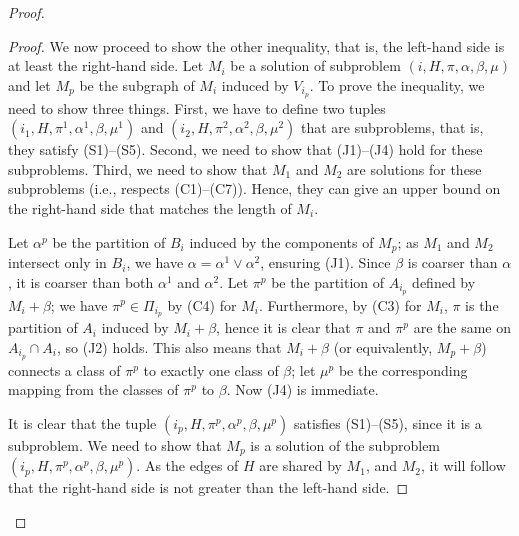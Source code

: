 \begin{proof}
\begin{proof}

We now proceed to show the other inequality, that is, the left-hand side is at least the right-hand side.
Let \(M_i\) be a solution of subproblem \((i, H, \pi, \alpha, \beta, \mu)\) and let \(M_p\) be the subgraph of \(M_i\) induced by \(V_{i_p}\). To prove the inequality, we need to show three things. First, we have to define two tuples \((i_1, H, \pi^1, \alpha^1,\beta,\mu^1)\) and \((i_2, H, \pi^2, \alpha^2,\beta,\mu^2)\) that are subproblems, that is, they satisfy (S1)–(S5). Second, we need to show that (J1)–(J4) hold for these subproblems. Third, we need to show that \(M_1\) and \(M_2\) are solutions for these subproblems (i.e., respects (C1)–(C7)). Hence, they can give an upper bound on the right-hand side that matches the length of \(M_i\).

Let \(\alpha^p\) be the partition of \(B_i\) induced by the components of \(M_p\); as \(M_1\) and \(M_2\) intersect only in \(B_i\), we have \(\alpha = \alpha^1 \vee \alpha^2\), ensuring (J1). Since \(\beta\) is coarser than \(\alpha\), it is coarser than both \(\alpha^1\) and \(\alpha^2\). Let \(\pi^p\) be the partition of \(A_{i_p}\) defined by \(M_i + \beta\); we have \(\pi^p \in \Pi_{i_p}\) by (C4) for \(M_i\). Furthermore, by (C3) for \(M_i\), \(\pi\) is the partition of \(A_i\) induced by \(M_i + \beta\), hence it is clear that \(\pi\) and \(\pi^p\) are the same on \(A_{i_p} \cap A_i\), so (J2) holds. This also means that \(M_i + \beta\) (or equivalently, \(M_p + \beta\)) connects a class of \(\pi^p\) to exactly one class of \(\beta\); let \(\mu^p\) be the corresponding mapping from the classes of \(\pi^p\) to \(\beta\). Now (J4) is immediate.

It is clear that the tuple \((i_p, H, \pi^p, \alpha^p, \beta, \mu^p)\) satisfies (S1)–(S5), since it is a subproblem. We need to show that \(M_p\) is a solution of the subproblem \((i_p, H, \pi^p, \alpha^p, \beta, \mu^p)\). As the edges of \(H\) are shared by \(M_1\), and \(M_2\), it will follow that the right-hand side is not greater than the left-hand side.


\end{proof}
\end{proof}
